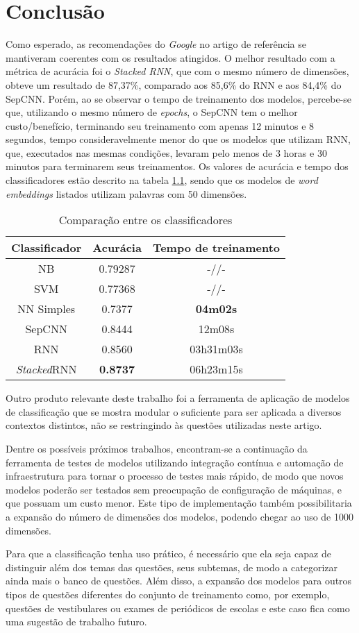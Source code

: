 \chapter{Conclusão}
\label{chapter:conclusao}
\noindent

Como esperado, as recomendações do \textit{Google} no artigo de referência se mantiveram coerentes com os resultados atingidos. O melhor resultado com a métrica de acurácia foi o \textit{Stacked RNN}, que com o mesmo número de dimensões, obteve um resultado de 87,37\%, comparado aos 85,6\% do RNN e aos 84,4\% do SepCNN. Porém, ao se observar o tempo de treinamento dos modelos, percebe-se que, utilizando o mesmo número de \textit{epochs}, o SepCNN tem o melhor custo/benefício, terminando seu treinamento com apenas 12 minutos e 8 segundos, tempo consideravelmente menor do que os modelos que utilizam RNN, que, executados nas mesmas condições, levaram pelo menos de 3 horas e 30 minutos para terminarem seus treinamentos. Os valores de acurácia e tempo dos classificadores estão descrito na tabela \ref{tab:comparisons}, sendo que os modelos de \textit{word embeddings} listados utilizam palavras com 50 dimensões.

\begin{table}[ht]
\centering
\caption{Comparação entre os classificadores}
\vspace{0.5cm}
\begin{tabular}{c|c|c}
 
Classificador & Acurácia & Tempo de treinamento \\
\hline
NB & 0.79287 & -//- \\
SVM & 0.77368 & -//- \\
NN Simples & 0.7377 & \textbf{04m02s} \\
SepCNN & 0.8444& 12m08s \\
RNN  & 0.8560 & 03h31m03s \\
\textit{Stacked}RNN & \textbf{0.8737} & 06h23m15s
\end{tabular}
\label{tab:comparisons}
\end{table}

Outro produto relevante deste trabalho foi a ferramenta de aplicação de modelos de classificação que se mostra modular o suficiente para ser aplicada a diversos contextos distintos, não se restringindo às questões utilizadas neste artigo. 

Dentre os possíveis próximos trabalhos, encontram-se a continuação da ferramenta de testes de modelos utilizando integração contínua e automação de infraestrutura para tornar o processo de testes mais rápido, de modo que novos modelos poderão ser testados sem preocupação de configuração de máquinas, e que possuam um custo menor. Este tipo de implementação também possibilitaria a expansão do número de dimensões dos modelos, podendo chegar ao uso de 1000 dimensões.

Para que a classificação tenha uso prático, é necessário que ela seja capaz de distinguir além dos temas das questões, seus subtemas, de modo a categorizar ainda mais o banco de questões. Além disso, a expansão dos modelos para outros tipos de questões diferentes do conjunto de treinamento como, por exemplo, questões de vestibulares ou exames de periódicos de escolas e este caso fica como uma sugestão de trabalho futuro.